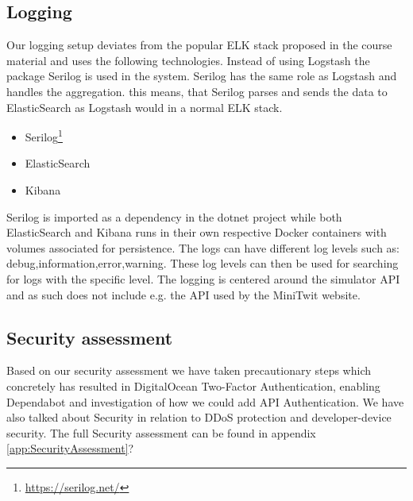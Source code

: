 \subsection{Logging}
Our logging setup deviates from the popular ELK stack proposed in the course material and uses the following technologies. Instead of using Logstash the package Serilog is used in the system. Serilog has the same role as Logstash and handles the aggregation. this means, that Serilog parses and sends the data to ElasticSearch as Logstash would in a normal ELK stack.
\begin{itemize}
    \item Serilog\footnote{\url{https://serilog.net/}}
    \item ElasticSearch
    \item Kibana 
\end{itemize}
Serilog is imported as a dependency in the dotnet project while both ElasticSearch and Kibana runs in their own respective Docker containers with volumes associated for persistence. The logs can have different log levels such as: debug,information,error,warning. These log levels can then be used for searching for logs with the specific level.
The logging is centered around the simulator API and as such does not include e.g. the API used by the MiniTwit website.\\ 





\subsection{Security assessment}
Based on our security assessment we have taken precautionary steps which concretely has resulted in DigitalOcean Two-Factor Authentication, enabling Dependabot and investigation of how we could add API Authentication. We have also talked about Security in relation to DDoS protection and developer-device security. The full Security assessment can be found in appendix \ref{app:SecurityAssessment}?

